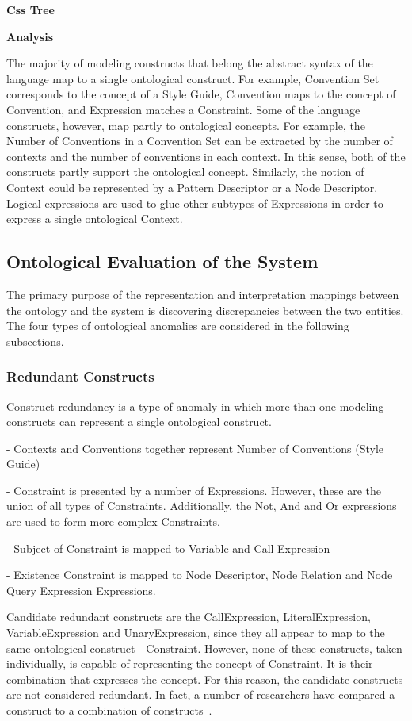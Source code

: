 \documentclass[parskip=full]{uvamscse}
\begin{document}
\textbf{Css Tree}

\textbf{Analysis}


The majority of modeling constructs that belong the abstract syntax of the language map to a single
ontological construct. For example, Convention Set corresponds to the concept of a Style Guide,
Convention maps to the concept of Convention, and Expression matches a Constraint. Some of the
language constructs, however, map partly to ontological concepts. For example, the Number of
Conventions in a Convention Set can be extracted by the number of contexts and the number of
conventions in each context. In this sense, both of the constructs partly support the ontological
concept. Similarly, the notion of Context could be represented by a Pattern Descriptor or a Node
Descriptor. Logical expressions are used to glue other subtypes of Expressions in order to express a
single ontological Context.

\subsection{Ontological Evaluation of the System}

The primary purpose of the representation and interpretation mappings between the ontology and the
system is discovering discrepancies between the two entities. The four types of ontological
anomalies are considered in the following subsections.

\subsubsection{Redundant Constructs} 

Construct redundancy is a type of anomaly in which more than one modeling constructs can represent a
single ontological construct. 

- Contexts and Conventions together represent Number of Conventions (Style Guide)

- Constraint is presented by a number of Expressions. However, these are the union of all types of Constraints. Additionally, the Not, And and Or expressions are used to form more complex Constraints.

- Subject of Constraint is mapped to Variable and Call Expression

- Existence Constraint is mapped to Node Descriptor, Node Relation and Node Query Expression Expressions.



Candidate redundant constructs are the CallExpression,
LiteralExpression, VariableExpression and UnaryExpression, since they all appear to map to the same
ontological construct - Constraint. However, none of these constructs, taken individually, is
capable of representing the concept of Constraint. It is their combination that expresses the
concept. For this reason, the candidate constructs are not considered redundant. In fact, a number
of researchers have compared a construct to a combination of constructs~\cite{gehlert2007toward}.
\end{document}
